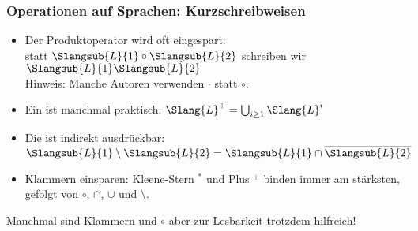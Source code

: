 \documentclass[aspectratio=1610,onlymath]{beamer}
\begin{document}
\begin{frame}\frametitle{Operationen auf Sprachen: Kurzschreibweisen}

\begin{itemize}
\item Der Produktoperator wird oft eingespart:\\ statt $\Slangsub{L}{1}\circ\Slangsub{L}{2}$ schreiben wir $\Slangsub{L}{1}\Slangsub{L}{2}$\\
{\footnotesize\textcolor{devilscss}{Hinweis: Manche Autoren verwenden $\cdot$ statt $\circ$.}}
%
\item Ein  ist manchmal praktisch: $\Slang{L}^+= \bigcup_{i\geq 1} \Slang{L}^i$
%
\item Die  ist indirekt ausdrückbar: $\Slangsub{L}{1}\setminus\Slangsub{L}{2} = \Slangsub{L}{1}\cap\overline{\Slangsub{L}{2}}$
%
\item Klammern einsparen: Kleene-Stern $^*$ und Plus $^+$ binden immer am stärksten, gefolgt  von $\circ$, $\cap$, $\cup$ und $\setminus$.
\end{itemize}

{\footnotesize Manchmal sind Klammern und $\circ$ aber zur Lesbarkeit trotzdem hilfreich!}
\bigskip
\pause

\end{frame}
\end{document}

